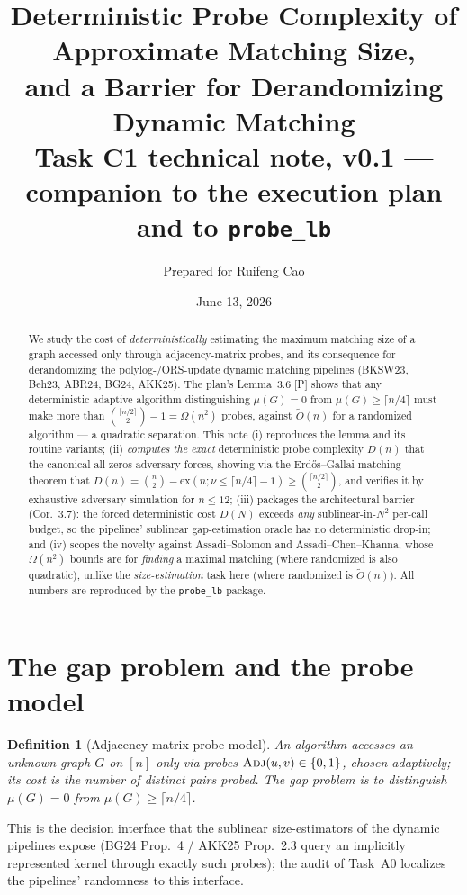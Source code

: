 \documentclass[11pt]{article}
\title{Deterministic Probe Complexity of Approximate Matching Size,\\
and a Barrier for Derandomizing Dynamic Matching\\[3pt]
{\large Task C1 technical note, v0.1 --- companion to the execution plan and to \texttt{probe\_lb}}}
\author{Prepared for Ruifeng Cao}
\date{June 13, 2026}
\newcommand{\statusP}{\textsf{\footnotesize[P]}}
\newcommand{\mm}{\mu}
\newcommand{\Otilde}{\widetilde{O}}
\newcommand{\Adj}{\textsc{Adj}}
\newtheorem{definition}{Definition}
\begin{document}
\maketitle

\begin{abstract}
\noindent We study the cost of \emph{deterministically} estimating the
maximum matching size of a graph accessed only through adjacency-matrix
probes, and its consequence for derandomizing the polylog-/ORS-update dynamic
matching pipelines (BKSW23, Beh23, ABR24, BG24, AKK25). The plan's
Lemma~3.6 \statusP{} shows that any deterministic adaptive algorithm
distinguishing $\mm(G)=0$ from $\mm(G)\ge\lceil n/4\rceil$ must make more than
$\binom{\lceil n/2\rceil}{2}-1=\Omega(n^2)$ probes, against $\Otilde(n)$ for a
randomized algorithm --- a quadratic separation. This note (i) reproduces the
lemma and its routine variants; (ii) \emph{computes the exact} deterministic
probe complexity $D(n)$ that the canonical all-zeros adversary forces,
showing via the Erd\H{o}s--Gallai matching theorem that
$D(n)=\binom n2-\mathrm{ex}(n;\nu\le\lceil n/4\rceil-1)\ge\binom{\lceil
n/2\rceil}{2}$, and verifies it by exhaustive adversary simulation for
$n\le 12$; (iii) packages the architectural barrier (Cor.~3.7): the forced
deterministic cost $D(N)$ exceeds \emph{any} sublinear-in-$N^2$ per-call
budget, so the pipelines' sublinear gap-estimation oracle has no deterministic
drop-in; and (iv) scopes the novelty against Assadi--Solomon and
Assadi--Chen--Khanna, whose $\Omega(n^2)$ bounds are for \emph{finding} a
maximal matching (where randomized is also quadratic), unlike the
\emph{size-estimation} task here (where randomized is $\Otilde(n)$). All
numbers are reproduced by the \texttt{probe\_lb} package.
\end{abstract}

\section{The gap problem and the probe model}\label{sec:model}

\begin{definition}[Adjacency-matrix probe model]\label{def:probe}
An algorithm accesses an unknown graph $G$ on $[n]$ only via probes
$\Adj(u,v)\in\{0,1\}$, chosen adaptively; its cost is the number of distinct
pairs probed. The \emph{gap problem} is to distinguish $\mm(G)=0$ from
$\mm(G)\ge\lceil n/4\rceil$.
\end{definition}

This is the decision interface that the sublinear size-estimators of the
dynamic pipelines expose (BG24 Prop.~4 / AKK25 Prop.~2.3 query an implicitly
represented kernel through exactly such probes); the audit of Task~A0 localizes
the pipelines' randomness to this interface.
\end{document}
